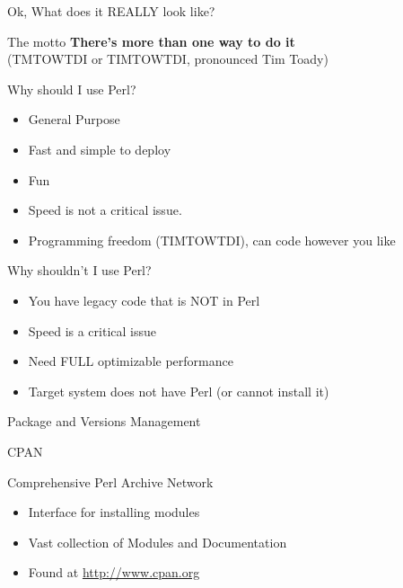 \documentclass{beamer}
\begin{document}
    \begin{frame}{Ok, What does it REALLY look like?}
       \tiny
       
    \end{frame}

    \begin{frame}{The motto}
    \center\huge {\bf There's more than one way to do it}\\
    (TMTOWTDI or TIMTOWTDI, pronounced Tim Toady)
    \end{frame}

    \begin{frame}{Why should I use Perl?}
        \begin{itemize}
            \item General Purpose
            \item Fast and simple to deploy
            \item Fun
            \item Speed is not a critical issue.
            \item Programming freedom (TIMTOWTDI), can code however you like
        \end{itemize}
    \end{frame}

    \begin{frame}{Why shouldn't I use Perl?}
        \begin{itemize}
            \item You have legacy code that is NOT in Perl
            \item Speed is a critical issue
            \item Need FULL optimizable performance
            \item Target system does not have Perl (or cannot install it)
        \end{itemize}
    \end{frame}

    \begin{frame}
        \center\huge Package and Versions Management
    \end{frame}

    \begin{frame}{CPAN}
        \begin{block}{Comprehensive Perl Archive Network}
            \begin{itemize}
                \item Interface for installing modules
                \item Vast collection of Modules and Documentation
                \item Found at \url{http://www.cpan.org}
            \end{itemize}
        \end{block}
    \end{frame}
\end{document}
